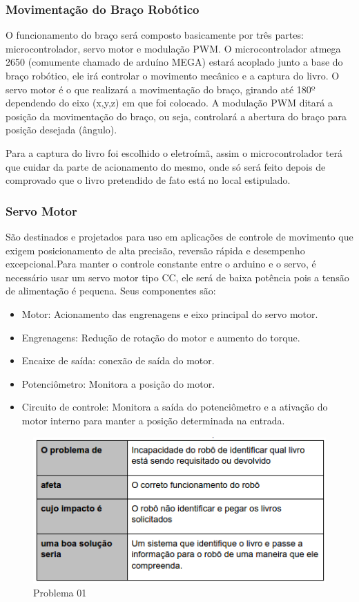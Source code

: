 \subsubsection{Movimentação do Braço Robótico}
O funcionamento do braço será composto basicamente por três partes: microcontrolador, servo motor e modulação PWM. O microcontrolador atmega 2650 (comumente chamado de arduíno MEGA)  estará acoplado junto a base do braço robótico, ele irá controlar o movimento mecânico e a captura do livro. O servo motor é o que realizará a movimentação do braço, girando até 180º dependendo do eixo (x,y,z) em que foi colocado. A modulação PWM ditará a posição da movimentação do braço, ou seja, controlará a abertura do braço para posição desejada (ângulo).

Para a captura do livro foi escolhido o eletroímã, assim o microcontrolador terá que cuidar da parte de acionamento do mesmo, onde só será feito depois de comprovado que o livro pretendido de fato está no local estipulado.

\subsubsection{Servo Motor}
São destinados e projetados para uso em aplicações de controle de movimento que exigem posicionamento de alta precisão, reversão rápida e desempenho excepcional.Para manter o controle constante entre o arduino e o servo, é necessário usar um servo motor tipo CC, ele será de baixa potência pois a tensão de alimentação é pequena. Seus componentes são:

\begin{itemize}
\item Motor: Acionamento das engrenagens e eixo principal do servo motor.
\item Engrenagens: Redução de rotação do motor e aumento do torque.
\item Encaixe de saída: conexão de saída do motor.
\item Potenciômetro: Monitora a posição do motor.
\item Circuito de controle: Monitora a saída do potenciômetro e a ativação do motor interno para manter a posição determinada na entrada.
\end{itemize}

\begin{figure}[!h]
\centering
\includegraphics[scale=0.65, angle = 360]{figuras/descricao_problema1}
\caption[]{Problema 01 \footnotemark}
\end{figure}
\FloatBarrier


